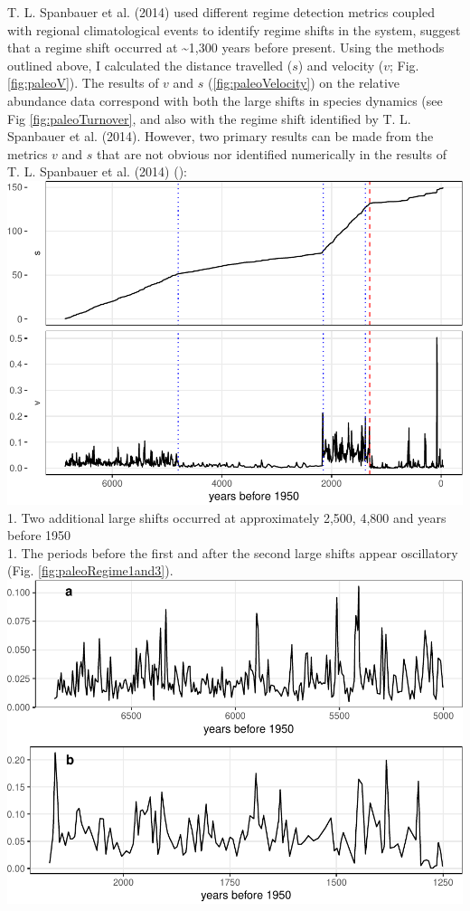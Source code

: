 \documentclass[12pt,twoside,openany]{reedthesis}
\begin{document}
T. L. Spanbauer et al. (2014) used different regime detection metrics
coupled with regional climatological events to identify regime shifts in
the system, suggest that a regime shift occurred at
\textasciitilde{}1,300 years before present. Using the methods outlined
above, I calculated the distance travelled (\(s\)) and velocity (\(v\);
Fig. \ref{fig:paleoV}). The results of \(v\) and \(s\)
(\ref{fig:paleoVelocity}) on the relative abundance data correspond with
both the large shifts in species dynamics (see Fig
\ref{fig:paleoTurnover}, and also with the regime shift identified by T.
L. Spanbauer et al. (2014). However, two primary results can be made
from the metrics \(v\) and \(s\) that are not obvious nor identified
numerically in the results of T. L. Spanbauer et al. (2014) ():
\includegraphics{_myDissertation_files/figure-latex/paleoVelocity-1.pdf}
1. Two additional large shifts occurred at approximately 2,500, 4,800
and years before 1950\\
1. The periods before the first and after the second large shifts appear
oscillatory (Fig. \ref{fig:paleoRegime1and3}).
\includegraphics{_myDissertation_files/figure-latex/paleoRegime1and3-1.pdf}
\end{document}
